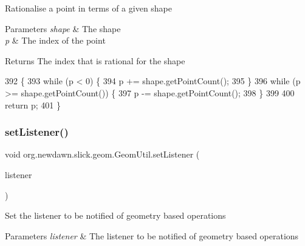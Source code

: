 Rationalise a point in terms of a given shape


\begin{DoxyParams}{Parameters}
{\em shape} & The shape \\
\hline
{\em p} & The index of the point \\
\hline
\end{DoxyParams}
\begin{DoxyReturn}{Returns}
The index that is rational for the shape 
\end{DoxyReturn}

\begin{DoxyCode}
392                                                         \{
393         \textcolor{keywordflow}{while} (p < 0) \{
394             p += shape.getPointCount();
395         \}
396         \textcolor{keywordflow}{while} (p >= shape.getPointCount()) \{
397             p -=  shape.getPointCount();
398         \}
399         
400         \textcolor{keywordflow}{return} p;
401     \}
\end{DoxyCode}
\mbox{\label{classorg_1_1newdawn_1_1slick_1_1geom_1_1_geom_util_a63310f3321f95f80909ae475187097f9}} 
\subsubsection{\texorpdfstring{set\+Listener()}{setListener()}}
{\footnotesize\ttfamily void org.\+newdawn.\+slick.\+geom.\+Geom\+Util.\+set\+Listener (\begin{DoxyParamCaption}\item[{\mbox{\hyperlink{interfaceorg_1_1newdawn_1_1slick_1_1geom_1_1_geom_util_listener}{Geom\+Util\+Listener}}}]{listener }\end{DoxyParamCaption})\hspace{0.3cm}{\ttfamily [inline]}}

Set the listener to be notified of geometry based operations


\begin{DoxyParams}{Parameters}
{\em listener} & The listener to be notified of geometry based operations \\
\hline
\end{DoxyParams}


